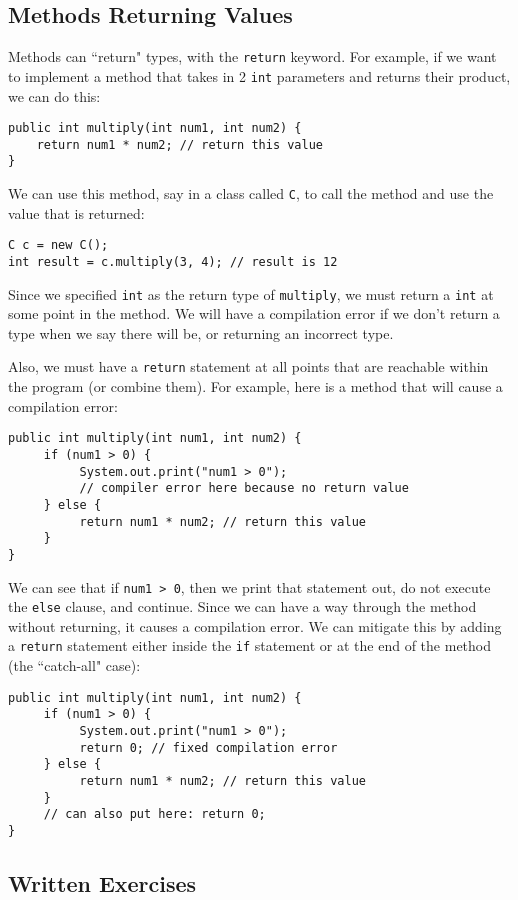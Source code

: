 \subsection{Methods Returning Values}
Methods can ``return" types, with the \verb|return| keyword. For example, if we want to implement a method that takes in 2 \verb|int| parameters and returns their product, we can do this:
\begin{lstlisting}
public int multiply(int num1, int num2) {
	return num1 * num2; // return this value
}
\end{lstlisting}
We can use this method, say in a class called \verb|C|, to call the method and use the value that is returned:
\begin{lstlisting}
C c = new C();
int result = c.multiply(3, 4); // result is 12
\end{lstlisting}
Since we specified \verb|int| as the return type of \verb|multiply|, we must return a \verb|int| at some point in the method. We will have a compilation error if we don't return a type when we say there will be, or returning an incorrect type.

\par Also, we must have a \verb|return| statement at all points that are reachable within the program (or combine them). For example, here is a method that will cause a compilation error:
\begin{lstlisting}
public int multiply(int num1, int num2) {
     if (num1 > 0) {
          System.out.print("num1 > 0");
          // compiler error here because no return value
     } else {
          return num1 * num2; // return this value
     }
}
\end{lstlisting}
We can see that if \verb|num1 > 0|, then we print that statement out, do not execute the \verb|else| clause, and continue. Since we can have a way through the method without returning, it causes a compilation error. We can mitigate this by adding a \verb|return| statement either inside the \verb|if| statement or at the end of the method (the ``catch-all" case):
\begin{lstlisting}
public int multiply(int num1, int num2) {
     if (num1 > 0) {
          System.out.print("num1 > 0");
          return 0; // fixed compilation error
     } else {
          return num1 * num2; // return this value
     }
     // can also put here: return 0;
}
\end{lstlisting}

\subsection{Written Exercises}

